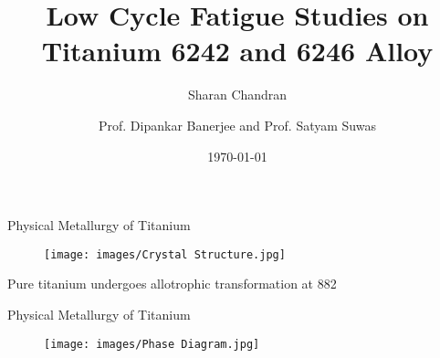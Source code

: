 \documentclass[10pt]{beamer}
\title{Low Cycle Fatigue Studies on Titanium 6242 and 6246 Alloy}
\subtitle{Sharan Chandran}
\date{\today}
\date{}
\author{Prof. Dipankar Banerjee and Prof. Satyam Suwas}
\institute{Indian Institute of Science}
\begin{document}

\maketitle


\iffalse
\begin{frame}{Things to do before Comprehensive Exam}
\begin{enumerate}
\item Quantitative Metallography
\begin{enumerate}
\item $\alpha$ phase volume fraction
\item $\alpha$ phase grain size
\end{enumerate}
\item \sout{Heat Treatment - TBD. Maintain same $\alpha$ phase fraction (as received) with different $\alpha$ grain size.}
\item Tensile test for as received specimens - Ti-6242
\item Initial EBSD Texture
\item \color{red} Fatigue Test - For Ti-6242 at 0.95, 0.85, 0.8 YS
\end{enumerate}
\end{frame}
\fi

{%
\begin{frame}[fragile]{Physical Metallurgy of Titanium}

\begin{figure}[H]
    \centering
        \texttt{[image: images/Crystal Structure.jpg]}
\end{figure}

Pure titanium undergoes allotrophic transformation at 882 \degC





\end{frame}
}

{%

\begin{frame}[fragile]{Physical Metallurgy of Titanium}

\begin{figure}[H]
    \centering
        \texttt{[image: images/Phase Diagram.jpg]}
\end{figure}

\end{frame}
}
\end{document}
